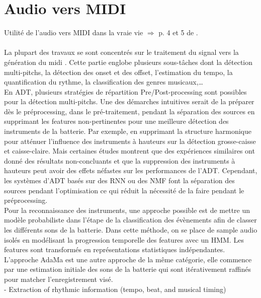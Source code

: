 \section{Audio vers MIDI}
Utilité de l’audio vers MIDI dans la vraie vie $\Rightarrow$ p. 4 et 5 de \cite{Review_ADT}.\\\\
La plupart des travaux se sont concentrés sur le traitement du signal vers la génération du midi \cite{AMT_for_2_Instru}. Cette partie englobe plusieurs sous-tâches dont la détection multi-pitchs, la détection des onset et des offset, l'estimation du tempo, la quantification du rythme, la classification des genres musicaux,…\\
En ADT\cite{Review_ADT}, plusieurs stratégies de répartition Pre/Post-processing sont possibles pour la détection multi-pitchs. Une des démarches intuitives serait de la préparer dès le préprocessing, dans le pré-traitement, pendant la séparation des sources en supprimant les features non-pertinentes pour une meilleure détection des instruments de la batterie. Par exemple, en supprimant la structure harmonique pour atténuer l’influence des instruments à hauteurs sur la détection grosse-caisse et caisse-claire. Mais certaines études montrent que des expériences similaires ont donné des résultats non-concluants et que la suppression des instruments à hauteurs peut avoir des effets néfastes sur les performances de l’ADT. Cependant, les systèmes d’ADT basés sur des RNN ou des NMF font la séparation des sources pendant l’optimisation ce qui réduit la nécessité de la faire pendant le préprocessing.\\
Pour la reconnaissance des instruments, une approche possible\cite{Eronen} est de mettre un modèle probabiliste dans l’étape de la classification des évènements afin de classer les différents sons de la batterie. Dans cette méthode, on se place de sample audio isolés en modélisant la progression temporelle des features avec un HMM. Les features sont transformés en représentations statistiques indépendantes.
L’approche AdaMa\cite{adama_1} est une autre approche de la même catégorie, elle commence par une estimation initiale des sons de la batterie qui sont itérativement raffinés pour matcher l’enregistrement visé.\\
- Extraction of rhythmic information (tempo, beat, and musical timing)\\
